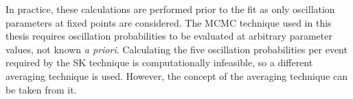 In practice, these calculations are performed prior to the fit as only oscillation parameters at fixed points are considered. The MCMC technique used in this thesis requires oscillation probabilities to be evaluated at arbitrary parameter values, not known \textit{a priori}. Calculating the five oscillation probabilities per event required by the SK technique is computationally infeasible, so a different averaging technique is used. However, the concept of the averaging technique can be taken from it.



